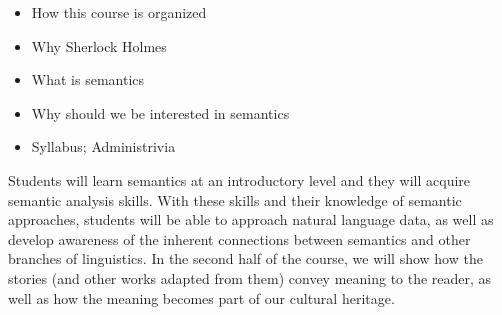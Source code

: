 \documentclass[a4paper,landscape,headrule,footrule,xetex,25pt]{foils}
\begin{document}

\begin{itemize}
\item How this course is organized
\item Why Sherlock Holmes
\item What is semantics
\item Why should we be interested in semantics
\item Syllabus; Administrivia
\end{itemize}








Students will learn semantics at an introductory level and they will
acquire semantic analysis skills. With these skills and their
knowledge of semantic approaches, students will be able to approach
natural language data, as well as develop awareness of the inherent
connections between semantics and other branches of linguistics.  In
the second half of the course, we will show how the stories (and other
works adapted from them) convey meaning to the reader, as well as how
the meaning becomes part of our cultural heritage.  


\end{document}
